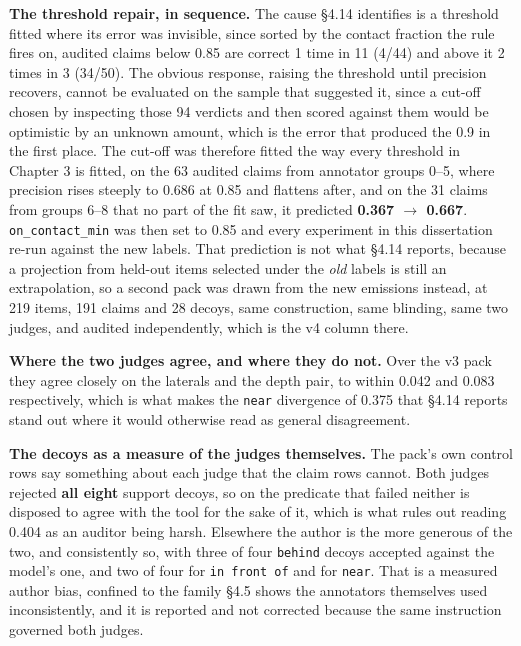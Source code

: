 \textbf{The threshold repair, in sequence.} The cause \S{}4.14 identifies is a threshold fitted where its error was invisible, since sorted by the contact fraction the rule fires on, audited claims below 0.85 are correct 1 time in 11 (4/44) and above it 2 times in 3 (34/50). The obvious response, raising the threshold until precision recovers, cannot be evaluated on the sample that suggested it, since a cut-off chosen by inspecting those 94 verdicts and then scored against them would be optimistic by an unknown amount, which is the error that produced the 0.9 in the first place. The cut-off was therefore fitted the way every threshold in Chapter 3 is fitted, on the 63 audited claims from annotator groups 0--5, where precision rises steeply to 0.686 at 0.85 and flattens after, and on the 31 claims from groups 6--8 that no part of the fit saw, it predicted \textbf{0.367 $\rightarrow$ 0.667}. \texttt{on\_\allowbreak{}contact\_\allowbreak{}min} was then set to 0.85 and every experiment in this dissertation re-run against the new labels. That prediction is not what \S{}4.14 reports, because a projection from held-out items selected under the \textit{old} labels is still an extrapolation, so a second pack was drawn from the new emissions instead, at 219 items, 191 claims and 28 decoys, same construction, same blinding, same two judges, and audited independently, which is the v4 column there.

\textbf{Where the two judges agree, and where they do not.} Over the v3 pack they agree closely on the laterals and the depth pair, to within 0.042 and 0.083 respectively, which is what makes the \texttt{near} divergence of 0.375 that \S{}4.14 reports stand out where it would otherwise read as general disagreement.

\textbf{The decoys as a measure of the judges themselves.} The pack's own control rows say something about each judge that the claim rows cannot. Both judges rejected \textbf{all eight} support decoys, so on the predicate that failed neither is disposed to agree with the tool for the sake of it, which is what rules out reading 0.404 as an auditor being harsh. Elsewhere the author is the more generous of the two, and consistently so, with three of four \texttt{behind} decoys accepted against the model's one, and two of four for \texttt{in front of} and for \texttt{near}. That is a measured author bias, confined to the family \S{}4.5 shows the annotators themselves used inconsistently, and it is reported and not corrected because the same instruction governed both judges.

